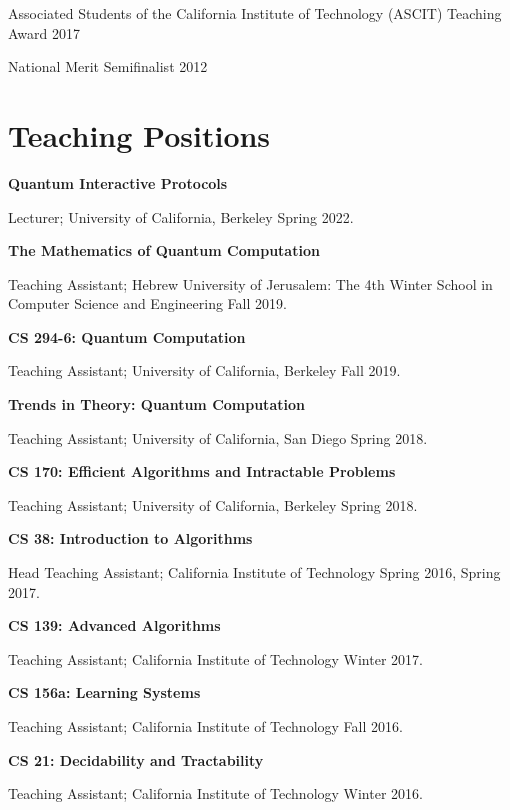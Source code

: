 \documentclass{article}
\begin{document}
Associated Students of the California Institute of Technology (ASCIT) Teaching Award 2017 

National Merit Semifinalist 2012 \\

\section{Teaching Positions}

\textbf{Quantum Interactive Protocols}

Lecturer; University of California, Berkeley Spring 2022.

\textbf{The Mathematics of Quantum Computation}

Teaching Assistant; Hebrew University of Jerusalem: The 4th Winter School in Computer Science and Engineering Fall 2019.

\textbf{CS 294-6: Quantum Computation}

Teaching Assistant; University of California, Berkeley Fall 2019.

\textbf{Trends in Theory: Quantum Computation}

Teaching Assistant; University of California, San Diego Spring 2018.

\textbf{CS 170: Efficient Algorithms and Intractable Problems}

Teaching Assistant; University of California, Berkeley Spring 2018.

\textbf{CS 38: Introduction to Algorithms}

Head Teaching Assistant; California Institute of Technology Spring 2016, Spring 2017.

\textbf{CS 139: Advanced Algorithms}

Teaching Assistant; California Institute of Technology Winter 2017.

\textbf{CS 156a: Learning Systems}

Teaching Assistant; California Institute of Technology Fall 2016.

\textbf{CS 21: Decidability and Tractability}

Teaching Assistant; California Institute of Technology Winter 2016.


\end{document}
